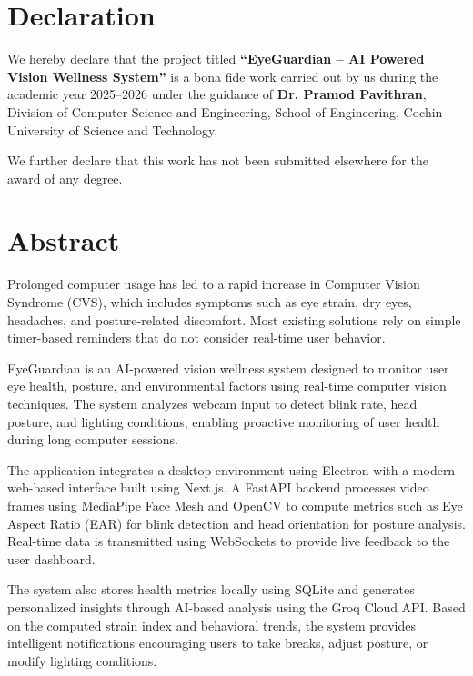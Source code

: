 \documentclass[12pt]{report}
\begin{document}

\chapter*{Declaration}

We hereby declare that the project titled \textbf{“EyeGuardian – AI Powered Vision Wellness System”} is a bona fide work carried out by us during the academic year 2025–2026 under the guidance of \textbf{Dr. Pramod Pavithran}, Division of Computer Science and Engineering, School of Engineering, Cochin University of Science and Technology.

We further declare that this work has not been submitted elsewhere for the award of any degree.


\chapter*{Abstract}

Prolonged computer usage has led to a rapid increase in Computer Vision Syndrome (CVS), which includes symptoms such as eye strain, dry eyes, headaches, and posture-related discomfort. Most existing solutions rely on simple timer-based reminders that do not consider real-time user behavior.

EyeGuardian is an AI-powered vision wellness system designed to monitor user eye health, posture, and environmental factors using real-time computer vision techniques. The system analyzes webcam input to detect blink rate, head posture, and lighting conditions, enabling proactive monitoring of user health during long computer sessions.

The application integrates a desktop environment using Electron with a modern web-based interface built using Next.js. A FastAPI backend processes video frames using MediaPipe Face Mesh and OpenCV to compute metrics such as Eye Aspect Ratio (EAR) for blink detection and head orientation for posture analysis. Real-time data is transmitted using WebSockets to provide live feedback to the user dashboard.

The system also stores health metrics locally using SQLite and generates personalized insights through AI-based analysis using the Groq Cloud API. Based on the computed strain index and behavioral trends, the system provides intelligent notifications encouraging users to take breaks, adjust posture, or modify lighting conditions.
\end{document}

